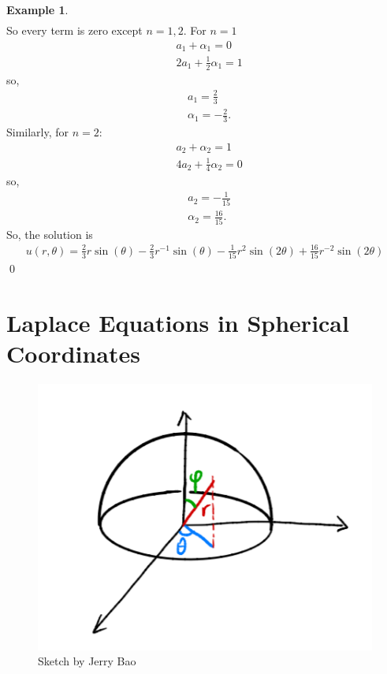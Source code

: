 \documentclass{book}
\theoremstyle{definition}
\newtheorem{exmp}{Example}[section]
\newcommand{\f}[2]{\frac{#1}{#2}}
\begin{document}
\begin{exmp}
\begin{align*}
	\end{align*}
	So every term is zero except $n = 1,2$. For $n=1$
	\begin{align*}
	&a_1 + \alpha_1 = 0\\
	&2a_1 + \frac{1}{2}\alpha_1 = 1
	\end{align*}
	so,
	\begin{align*}
	&a_1 = \frac{2}{3}\\
	&\alpha_1 = -\frac{2}{3}.
	\end{align*}
	Similarly, for $n=2$:
	\begin{align*}
	&a_2 + \alpha_2 = 1\\
	&4a_2 + \frac{1}{4}\alpha_2 = 0
	\end{align*}
	so,
	\begin{align*}
	&a_2 = -\frac{1}{15}\\
	&\alpha_2 = \frac{16}{15}.
	\end{align*}
	So, the solution is
	\begin{align*}
	\boxed{u(r,\theta) = \frac{2}{3}r\sin(\theta) - \frac{2}{3}r^{-1}\sin(\theta) - \f{1}{15}r^2\sin(2\theta) + \f{16}{15}r^{-2}\sin(2\theta)}
	\end{align*}\qed
\end{exmp}


\newpage

\chapter{Laplace Equations in Spherical Coordinates}

\begin{figure}[h!]
	\centering
	\includegraphics[scale=1]{sphere.png}
	\caption{Sketch by Jerry Bao}
\end{figure}
\end{document}
